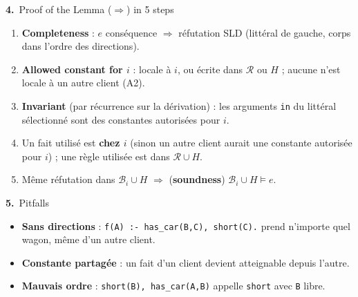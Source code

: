 \documentclass[10pt]{article}
\newcommand{\num}[1]{\textcolor{marine}{\textbf{#1.}}~}
\begin{document}
\begin{minipage}[t]{0.495\textwidth}
\begin{bloc}[fontupper=\scriptsize\raggedright]{\num{4}Proof of the Lemma ($\Rightarrow$) in 5 steps}
\begin{enumerate}[leftmargin=12pt, itemsep=0pt, topsep=1pt]
  \item \textbf{Completeness} : $e$ conséquence $\Rightarrow$ réfutation SLD (littéral de gauche, corps dans l'ordre des directions).
  \item \textbf{Allowed constant for $i$} : locale à $i$, ou écrite dans $\mathcal{R}$ ou $H$ ; aucune n'est locale à un autre client (A2).
  \item \textbf{Invariant} (par récurrence sur la dérivation) : les arguments \texttt{in} du littéral sélectionné sont des constantes autorisées pour $i$.
  \item Un fait utilisé est \textbf{chez $i$} (sinon un autre client aurait une constante autorisée pour $i$) ; une règle utilisée est dans $\mathcal{R}\cup H$.
  \item Même réfutation dans $\mathcal{B}_i\cup H$ $\Rightarrow$ (\textbf{soundness}) $\mathcal{B}_i\cup H\models e$.
\end{enumerate}
\end{bloc}
\vspace{2pt}
\begin{bloc}[fontupper=\scriptsize\raggedright]{\num{5}Pitfalls}
\begin{itemize}
  \item \textbf{Sans directions} : \texttt{f(A) :- has\_car(B,C), short(C).} prend n'importe quel wagon, même d'un autre client.
  \item \textbf{Constante partagée} : un fait d'un client devient atteignable depuis l'autre.
  \item \textbf{Mauvais ordre} : \texttt{short(B), has\_car(A,B)} appelle \texttt{short} avec \texttt{B} libre.
\end{itemize}
\end{bloc}
\end{minipage}
\end{document}
